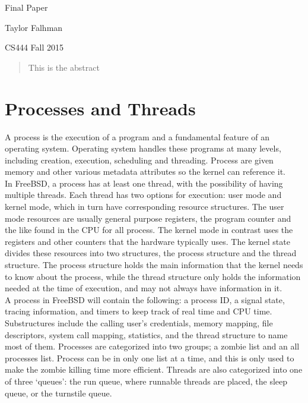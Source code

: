 \documentclass[titlepage]{article}
\begin{document}
\begin{titlepage}
\centering
{\Huge Final Paper\par}
{\LARGE Taylor Falhman\par}
{\Large CS444 Fall 2015\par}
\end{titlepage}

\begin{abstract}
\begin{singlespace}
This is the abstract
\end{singlespace}
\end{abstract}

\section{Processes and Threads}
\begin{singlespace}
    A process is the execution of a program and a fundamental feature     of an operating system. Operating system handles these programs at many levels, including creation, execution, scheduling and threading. Process are given memory and other various metadata attributes so the kernel can reference it.\\ 
    In FreeBSD, a process has at least one thread, with the possibility of having multiple threads. Each thread has two options for execution: user mode and kernel mode, which in turn have corresponding resource structures. The user mode resources are usually general purpose registers, the program counter and the like found in the CPU for all process. The kernel mode in contrast uses the registers and other counters that the hardware typically uses. The kernel state divides these resources into two structures, the process structure and the thread structure. The process structure holds the main information that the kernel needs to know about the process, while the thread structure only holds the information needed at the time of execution, and may not always have information in it.\\
    A process in FreeBSD will contain the following: a process ID, a signal state, tracing information, and timers to keep track of real time and CPU time. Substructures include the calling user’s credentials, memory mapping, file descriptors, system call mapping, statistics, and the thread structure to name most of them. Processes are categorized into two groups; a zombie list and an all processes list. Process can be in only one list at a time, and this is only used to make the zombie killing time more efficient. Threads are also categorized into one of three ‘queues’: the run queue, where runnable threads are placed, the sleep queue, or the turnstile queue. \\

\end{singlespace}
\end{document}
